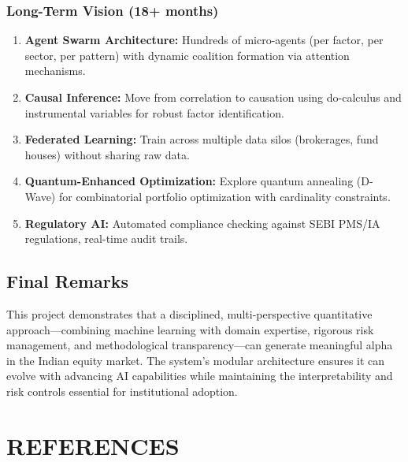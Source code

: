 \documentclass[12pt,a4paper]{report}
\begin{document}
\subsection{Long-Term Vision (18+ months)}
\begin{enumerate}
\item \textbf{Agent Swarm Architecture:} Hundreds of micro-agents (per factor, per sector, per pattern) with dynamic coalition formation via attention mechanisms.
\item \textbf{Causal Inference:} Move from correlation to causation using do-calculus and instrumental variables for robust factor identification.
\item \textbf{Federated Learning:} Train across multiple data silos (brokerages, fund houses) without sharing raw data.
\item \textbf{Quantum-Enhanced Optimization:} Explore quantum annealing (D-Wave) for combinatorial portfolio optimization with cardinality constraints.
\item \textbf{Regulatory AI:} Automated compliance checking against SEBI PMS/IA regulations, real-time audit trails.
\end{enumerate}

\section{Final Remarks}
This project demonstrates that a disciplined, multi-perspective quantitative approach---combining machine learning with domain expertise, rigorous risk management, and methodological transparency---can generate meaningful alpha in the Indian equity market. The system's modular architecture ensures it can evolve with advancing AI capabilities while maintaining the interpretability and risk controls essential for institutional adoption.

\chapter*{REFERENCES}

\renewcommand{\baselinestretch}{1.0}\small\normalsize
\end{document}
